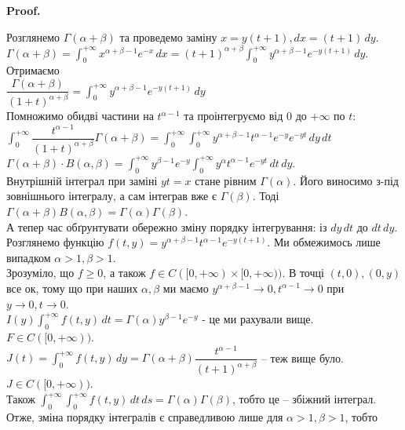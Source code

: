 \documentclass[a4paper, 10pt]{article}
\makeatletter
\def\huge{\displaystyle}
\def\qed{$\blacksquare$}
\theoremstyle{theoremdd}
\theoremstyle{theoremdd}
\theoremstyle{theoremdd}
\theoremstyle{theoremdd}
\theoremstyle{theoremdd}
\theoremstyle{theoremdd}
\theoremstyle{theoremdd}
\theoremstyle{theoremdd}
\theoremstyle{theoremdd}
\renewenvironment{proof}[1][Proof.\\]{\par
\pushQED{\hfill \qed}%
\normalfont \topsep6\p@\@plus6\p@\relax
\trivlist
\item\relax
{\bfseries
#1\@addpunct{.}}\hspace\labelsep\ignorespaces
}{%
\popQED\endtrivlist\@endpefalse
}
\makeatother
\begin{document}
\iffalse
\begin{proof}
Розглянемо $\Gamma(\alpha+\beta)$ та проведемо заміну $x = y(t+1), dx = (t+1)\,dy$.\\
$\Gamma(\alpha+\beta) = \huge \int_0^{+\infty} x^{\alpha+\beta-1} e^{-x}\,dx = (t+1)^{\alpha+\beta} \int_0^{+\infty} y^{\alpha+\beta-1}e^{-y(t+1)}\,dy$.\\
Отримаємо\\
$\dfrac{\Gamma(\alpha+\beta)}{(1+t)^{\alpha+\beta}} = \huge \int_0^{+\infty} y^{\alpha+\beta-1}e^{-y(t+1)}\,dy$\\
Помножимо обидві частини на $t^{\alpha-1}$ та проінтегруємо від $0$ до $+\infty$ по $t$:\\
$\huge \int_0^{+\infty} \dfrac{t^{\alpha-1}}{(1+t)^{\alpha+\beta}} \Gamma(\alpha+\beta) = \huge \int_0^{+\infty} \int_0^{+\infty} y^{\alpha+\beta-1} t^{\alpha-1}e^{-y}e^{-yt}\,dy\,dt$\\
$\Gamma(\alpha+\beta) \cdot B(\alpha,\beta) = \huge \int_0^{+\infty} y^{\beta-1} e^{-y} \int_0^{+\infty} y^{\alpha} t^{\alpha-1}e^{-yt}\,dt \,dy$.\\
Внутрішній інтеграл при заміні $yt = x$ стане рівним $\Gamma(\alpha)$. Його виносимо з-під зовнішнього інтегралу, а сам інтеграв вже є $\Gamma(\beta)$. Тоді\\
$\Gamma(\alpha+\beta) B(\alpha, \beta) = \Gamma(\alpha) \Gamma(\beta)$.
\bigskip \\
А тепер час обґрунтувати обережно зміну порядку інтегрування: із $dy \,dt$ до $dt\,dy$.\\
Розглянемо функцію $f(t,y) = y^{\alpha+\beta-1} t^{\alpha-1}e^{-y(t+1)}$. Ми обмежимось лише випадком $\alpha >1, \beta > 1$.\\
Зрозуміло, що $f \geq 0$, а також $f \in C([0,+\infty) \times [0,+\infty))$. В точці $(t,0),(0,y)$ все ок, тому що при наших $\alpha,\beta$ ми маємо $y^{\alpha+\beta-1} \to 0, t^{\alpha-1} \to 0$ при $y \to 0, t \to 0$.\\
$I(y) \huge\int_0^{+\infty} f(t,y)\,dt = \Gamma(\alpha) y^{\beta-1}e^{-y}$ - це ми рахували вище. $F \in C([0,+\infty))$.\\
$J(t) = \huge\int_0^{+\infty} f(t,y)\,dy = \Gamma(\alpha+\beta) \dfrac{t^{\alpha-1}}{(t+1)^{\alpha+\beta}}$ -- теж вище було. $J \in C([0,+\infty))$.\\
Також $\huge\int_0^{+\infty} \huge\int_0^{+\infty} f(t,y)\,dt\,ds = \Gamma(\alpha) \Gamma(\beta)$, тобто це -- збіжний інтеграл.\\
Отже, зміна порядку інтегралів є справедливою лише для $\alpha >1, \beta > 1$, тобто\\

\end{proof}
\end{document}
